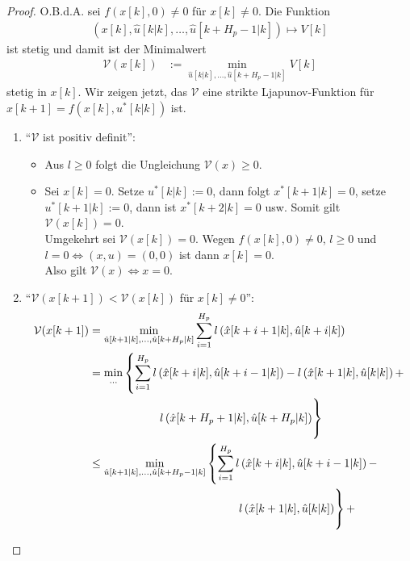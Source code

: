 \begin{proof}
O.B.d.A. sei $f(x[k],0)\neq 0$ für $x[k]\neq 0$. Die Funktion
\begin{align*}
	\left( x[k],\hat{u}[k|k],\ldots,\hat{u}[k+H_p-1|k] \right) \mapsto V[k]
\end{align*}
ist stetig und damit ist der Minimalwert
\begin{align*}
	\mathcal{V}(x[k]) & := \min\limits_{\hat{u}[k|k],\ldots,\hat{u}[k+H_p-1|k]}V[k]
\end{align*}
stetig in $x[k]$. Wir zeigen jetzt, das $\mathcal{V}$ eine strikte Ljapunov-Funktion für $x[k+1]=f(x[k],u^{\ast}[k|k])$ ist.
\begin{enumerate}
  \item "`$\mathcal{V}$ ist positiv definit"':
  \begin{itemize}
    \item Aus $l\ge 0$ folgt die Ungleichung $\mathcal{V}(x)\ge 0$.
    \item Sei $x[k]=0$. Setze $u^{\ast}[k|k]:=0$, dann folgt $x^{\ast}[k+1|k]=0$, setze $u^{\ast}[k+1|k]:=0$, dann ist $x^{\ast}[k+2|k]=0$ usw. Somit gilt $\mathcal{V}(x[k])=0$.\\
    Umgekehrt sei $\mathcal{V}(x[k])=0$. Wegen $f(x[k],0)\neq 0$, $l\ge 0$ und $l=0 \Leftrightarrow (x,u)=(0,0)$ ist dann $x[k]=0$.\\
    Also gilt $\mathcal{V}(x)\Leftrightarrow x=0$.
  \end{itemize}
  \item "`$\mathcal{V}(x[k+1])<\mathcal{V}(x[k])$ für $x[k]\neq 0$"':
  \begin{align*}
  	\mathcal{V}(x[k+1]) & = \min\limits_{\hat{u}[k+1|k],\ldots,\hat{u}[k+H_p|k]}\sum\limits_{i=1}^{H_p}l\left( \hat{x}[k+i+1|k],\hat{u}[k+i|k] \right)\\
  	& = \min\limits_{\ldots}\left\{ \sum\limits_{i=1}^{H_p}l\left( \hat{x}[k+i|k],\hat{u}[k+i-1|k] \right) - l\left( \hat{x}[k+1|k],\hat{u}[k|k] \right) + \right. \\
  	& \qquad \qquad \qquad \left.\vphantom{\sum\limits_{i=1}^{H_p}} l\left( \hat{x}[k+H_p+1|k],\hat{u}[k+H_p|k] \right) \right\}\\
  	& \le \min\limits_{\hat{u}[k+1|k],\ldots,\hat{u}[k+H_p-1|k]}\left\{ \sum\limits_{i=1}^{H_p}l\left( \hat{x}[k+i|k],\hat{u}[k+i-1|k] \right) - \right.\\
  	& \qquad \qquad \qquad\qquad \qquad\qquad\quad \left.\vphantom{\sum\limits_{i=1}^{H_p}} l\left( \hat{x}[k+1|k],\hat{u}[k|k] \right) \right\}+\\

\end{align*}
\end{enumerate}
\end{proof}
